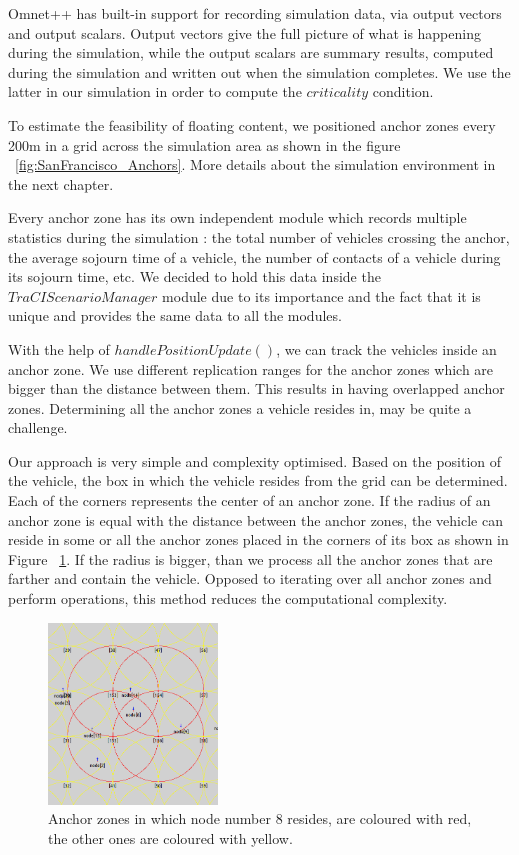 Omnet++ has built-in support for recording simulation data, via output vectors
and output scalars. Output vectors give the full picture of what is happening
during the simulation, while the output scalars are summary results, computed
during the simulation and written out when the simulation completes. We use the
latter in our simulation in order to compute the $criticality$ condition.

To estimate the feasibility of floating content, we positioned anchor zones
every 200m in a grid across the simulation area as shown in the figure
~\ref{fig:SanFrancisco_Anchors}. More details about the simulation environment
in the next chapter.

Every anchor zone has its own independent module which records multiple
statistics during the simulation : the total number of vehicles crossing the
anchor, the average sojourn time of a vehicle, the number of contacts of a
vehicle during its sojourn time, etc. We decided to hold this data inside the
$TraCIScenarioManager$ module due to its importance and the fact that it is
unique and provides the same data to all the modules.

With the help of $handlePositionUpdate()$, we can track the vehicles inside an
anchor zone. We use different replication ranges for the anchor zones which are
bigger than the distance between them. This results in having overlapped anchor
zones. Determining all the anchor zones a vehicle resides in, may be quite a
challenge.

Our approach is very simple and complexity optimised. Based on the position of
the vehicle, the box in which the vehicle resides from the grid can be
determined. Each of the corners represents the center of an anchor zone. If the
radius of an anchor zone is equal with the distance between the anchor zones,
the vehicle can reside in some or all the anchor zones placed in the corners of
its box as shown in Figure ~\ref{fig:node_az}. If the radius is bigger, than we
process all the anchor zones that are farther and contain the vehicle.
Opposed to iterating over all anchor zones and perform operations, this method
reduces the computational complexity.

\begin{figure}[t]
	\centering
	\includegraphics[width=0.4\textwidth]{img/node_az}
	\caption{Anchor zones in which node number 8 resides, are coloured with red,
	the other ones are coloured with yellow.}
	\label{fig:node_az}
\end{figure}

